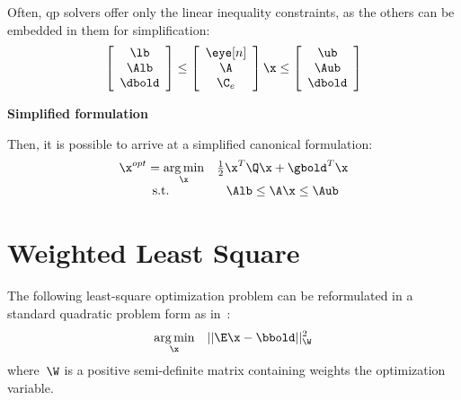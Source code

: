 Often, \gls{qp} solvers offer only the linear inequality constraints, as the others can
be embedded in them for simplification:
\begin{gather}
  \left[\begin{array}{c}
          \lb \\
          \Alb \\
          \dbold
        \end{array}\right] \leq
    \left[\begin{array}{c}
            \eye[ n ] \\
            \A \\
            \C_e
          \end{array}\right] \x \leq
    \left[\begin{array}{c}
            \ub \\
            \Aub \\
            \dbold
          \end{array}\right]
\end{gather}

\textbf{Simplified formulation}

Then, it is possible to arrive at a simplified canonical formulation:
\begin{gather}
  \begin{array}{cc}
    \x^{opt}=
    \underset{\x}{\arg \min } & \frac{1}{2} \x^{T} \Q \x
                                +\gbold^{T} \x \\
    \text { s.t. } & \Alb \leq \A \x \leq \Aub
  \end{array}
\end{gather}

\section{Weighted Least Square}
\label{sec:leastsquare_qp}

The following least-square optimization problem can be reformulated in a standard quadratic problem form as in~:
\begin{gather}
  \label{eqn:qp_least_squares}
  \underset{\x}{\arg \min }\quad ||\E\x - \bbold||^2_{\W}
\end{gather}
where~${\W}$ is a positive semi-definite matrix containing weights the
optimization variable.

